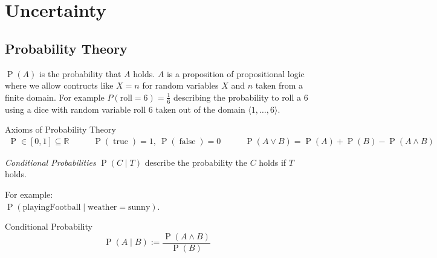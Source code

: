 \documentclass[english]{panikzettel}
\begin{document}
\section{Uncertainty}
\subsection{Probability Theory}
$\operatorname{P}(A)$ is the probability that $A$ holds. $A$ is a proposition of propositional logic where we allow contructs like $X=n$ for random variables $X$ and $n$ taken from a finite domain. For example $P(\text{roll}=6) = \frac{1}{6}$ describing the probability to roll a 6 using a dice with random variable roll $6$ taken out of the domain $\langle 1,\dots,6\rangle$.

\begin{defi}{Axioms of Probability Theory}
\small
\[ \begin{array}{lcr}
    \operatorname{P} \in [0,1] \subseteq \mathbb{R}\qquad & \operatorname{P}(\operatorname{true}) = 1,~ \operatorname{P}(\operatorname{false}) = 0 & \qquad\operatorname{P}(A \lor B) = \operatorname{P}(A) + \operatorname{P}(B) - \operatorname{P}(A \land B)
\end{array} \]
\end{defi}
\medskip

\begin{halfboxl}
\emph{Conditional Probabilities} $\operatorname{P} (C\mid T)$ describe the probability the $C$ holds if $T$ holds.

For example: \\
$\operatorname{P} (\text{playingFootball} \mid \text{weather}=\text{sunny})$.
\end{halfboxl}%
\begin{halfboxr}
\vspace{-\baselineskip}
\begin{defi}{Conditional Probability}
\[\operatorname P (A\mid B) := \frac{\operatorname{P}(A\land B)}{\operatorname{P} (B)}\]
\end{defi}
\end{halfboxr}
\medskip
\end{document}
